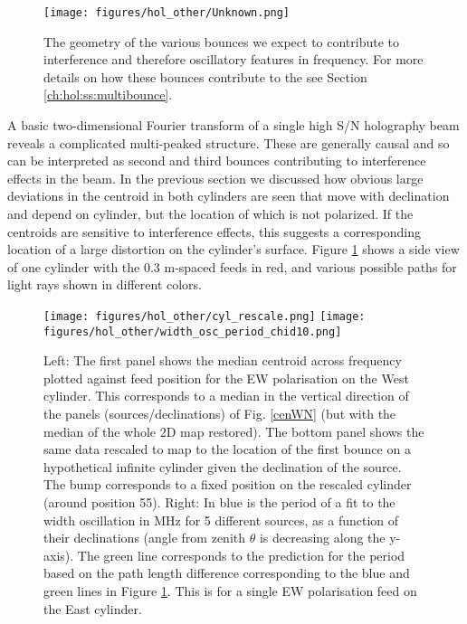 \begin{figure}[h!]
\begin{center}
\texttt{[image: figures/hol\_other/Unknown.png]}
\end{center}
\caption{The geometry of the various bounces we expect to contribute to interference and therefore oscillatory features in frequency. For more details on how these bounces contribute to the see Section \ref{ch:hol:ss:multibounce}. }
\label{unknown}
\end{figure}

A basic two-dimensional Fourier transform of a single high S/N holography beam reveals a complicated multi-peaked structure. These are generally causal and so can be interpreted as second and third bounces contributing to interference effects in the beam. In the previous section we discussed how obvious large deviations in the centroid in both cylinders are seen that move with declination and depend on cylinder, but the location of which is not polarized. If the centroids are sensitive to interference effects, this suggests a corresponding location of a large distortion on the cylinder's surface. Figure \ref{unknown} shows a side view of one cylinder with the 0.3 m-spaced feeds in red, and various possible paths for light rays shown in different colors. 

\begin{figure}[h!]
\begin{center}
\texttt{[image: figures/hol\_other/cyl\_rescale.png]}
\texttt{[image: figures/hol\_other/width\_osc\_period\_chid10.png]}
\caption{Left: The first panel shows the median centroid across frequency plotted against feed position for the EW polarisation on the West cylinder. This corresponds to a median in the vertical direction of the panels (sources/declinations) of Fig. \ref{cenWN} (but with the median of the whole 2D map restored). The bottom panel shows the same data rescaled to map to the location of the first bounce on a hypothetical infinite cylinder given the declination of the source. The bump corresponds to a fixed position on the rescaled cylinder (around position 55).
\newline
Right: In blue is the period of a fit to the width oscillation in MHz for 5 different sources, as a function of their declinations (angle from zenith $\theta$ is decreasing along the y-axis). The green line corresponds to the prediction for the period based on the path length difference corresponding to the blue and green lines in Figure \ref{unknown}. This is for a single EW polarisation feed on the East cylinder. \label{confirm}}
\end{center}
\end{figure}


